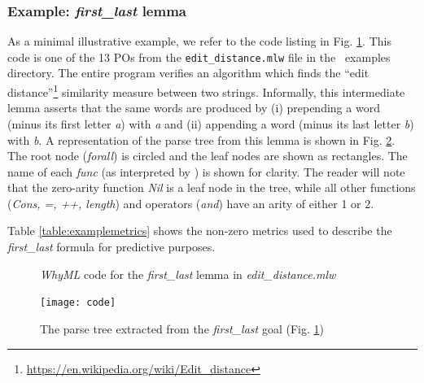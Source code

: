 \subsubsection{Example: \textit{first\_last} lemma}

As a minimal illustrative example, we refer to the code listing in Fig. \ref{fig:code}. 
This code is one of the 13 POs from the \texttt{edit\_distance.mlw} file in the \why~examples directory. 
The entire program verifies an algorithm which finds the ``edit distance''\footnote{\url{https://en.wikipedia.org/wiki/Edit_distance}} similarity measure between two strings.  
Informally, this intermediate lemma asserts that the same words are produced by (i) prepending a word (minus its first letter \textit{a}) with \textit{a} and (ii) appending a word (minus its last letter \textit{b}) with \textit{b}. 
A representation of the parse tree from this lemma is shown in Fig. \ref{fig:tree}. 
The root node (\textit{forall}) is circled and the leaf nodes are shown as rectangles.
The name of each \textit{func} (as interpreted by \why) is shown for clarity.
The reader will note that the zero-arity function \textit{Nil} is a leaf node in the tree, while all other functions (\textit{Cons, =, ++, length}) and operators (\textit{and}) have an arity of either 1 or 2. 

Table \ref{table:examplemetrics} shows the non-zero metrics used to describe the \textit{first\_last} formula for predictive purposes.

\begin{figure}
	\centering 
	
	\caption{ \textit{WhyML} code for the \textit{first\_last} lemma in \textit{edit\_distance.mlw}}
	\label{fig:code}
\end{figure}

\begin{figure}
	\centering
	\texttt{[image: code]}
	\caption{The parse tree extracted from the \textit{first\_last} goal (Fig. \ref{fig:code})}
	\label{fig:tree}
\end{figure}




